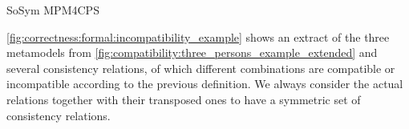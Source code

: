 \begin{copiedFrom}{SoSym MPM4CPS}
\begin{example}
\autoref{fig:correctness:formal:incompatibility_example} shows an extract of the three metamodels from \autoref{fig:compatibility:three_persons_example_extended} and several consistency relations, of which different combinations are compatible or incompatible according to the previous definition.
We always consider the actual relations together with their transposed ones to have a symmetric set of consistency relations.




\end{example}
\end{copiedFrom}

